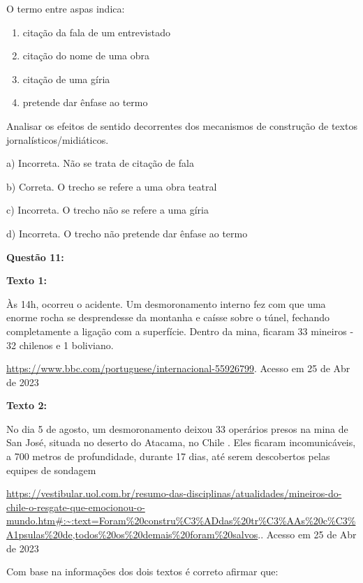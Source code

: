 O termo entre aspas indica:

\begin{enumerate}
\def\labelenumi{\alph{enumi})}
\item
  citação da fala de um entrevistado
\item
  citação do nome de uma obra
\item
  citação de uma gíria
\item
  pretende dar ênfase ao termo
\end{enumerate}

Analisar os efeitos de sentido decorrentes dos mecanismos de construção
de textos jornalísticos/midiáticos.

a) Incorreta. Não se trata de citação de fala

b) Correta. O trecho se refere a uma obra teatral

c) Incorreta. O trecho não se refere a uma gíria

d) Incorreta. O trecho não pretende dar ênfase ao termo

\textbf{Questão 11:}

\textbf{Texto 1:}

Às 14h, ocorreu o acidente. Um desmoronamento interno fez com que uma
enorme rocha se desprendesse da montanha e caísse sobre o túnel,
fechando completamente a ligação com a superfície. Dentro da mina,
ficaram 33 mineiros - 32 chilenos e 1 boliviano.

\href{https://www.bbc.com/portuguese/internacional-55926799}{{https://www.bbc.com/portuguese/internacional-55926799}}.
Acesso em 25 de Abr de 2023

\textbf{Texto 2:}

No dia 5 de agosto, um desmoronamento deixou 33 operários presos na mina
de San José, situada no deserto do Atacama, no Chile . Eles ficaram
incomunicáveis, a 700 metros de profundidade, durante 17 dias, até serem
descobertos pelas equipes de sondagem

\href{https://vestibular.uol.com.br/resumo-das-disciplinas/atualidades/mineiros-do-chile-o-resgate-que-emocionou-o-mundo.htm\#:~:text=Foram\%20constru\%C3\%ADdas\%20tr\%C3\%AAs\%20c\%C3\%A1psulas\%20de,todos\%20os\%20demais\%20foram\%20salvos}{{https://vestibular.uol.com.br/resumo-das-disciplinas/atualidades/mineiros-do-chile-o-resgate-que-emocionou-o-mundo.htm\#:\textasciitilde:text=Foram\%20constru\%C3\%ADdas\%20tr\%C3\%AAs\%20c\%C3\%A1psulas\%20de,todos\%20os\%20demais\%20foram\%20salvos}}..
Acesso em 25 de Abr de 2023

Com base na informações dos dois textos é correto afirmar que:

